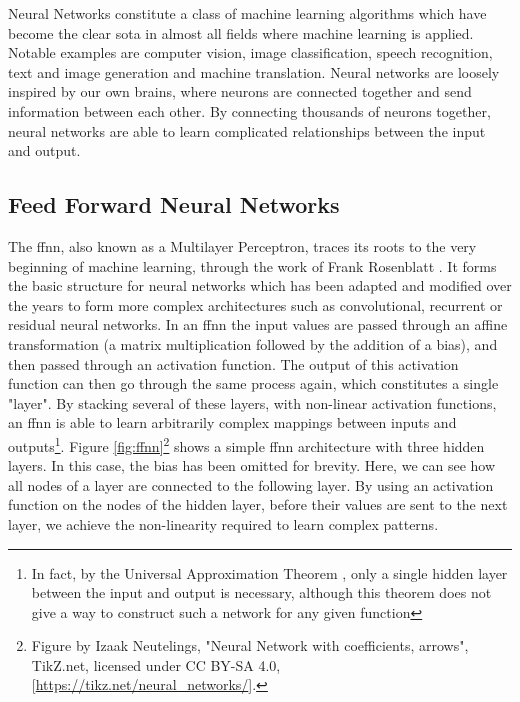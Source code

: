 \documentclass[UKenglish]{uiomasterthesis} %
\theoremstyle{definition}
\begin{document}
Neural Networks constitute a class of machine learning algorithms which have become the clear \ac{sota} in almost all fields where machine learning is applied. Notable examples are computer vision, image classification, speech recognition, text and image generation and machine translation. Neural networks are loosely inspired by our own brains, where neurons are connected together and send information between each other. By connecting thousands of neurons together, neural networks are able to learn complicated relationships between the input and output.

\subsection{Feed Forward Neural Networks}

The \ac{ffnn}, also known as a Multilayer Perceptron, traces its roots to the very beginning of machine learning, through the work of Frank Rosenblatt \cite{rosenblatt}. It forms the basic structure for neural networks which has been adapted and modified over the years to form more complex architectures such as convolutional, recurrent or residual neural networks. In an \ac{ffnn} the input values are passed through an affine transformation (a matrix multiplication followed by the addition of a bias), and then passed through an activation function. The output of this activation function can then go through the same process again, which constitutes a single "layer". By stacking several of these layers, with non-linear activation functions, an \ac{ffnn} is able to learn arbitrarily complex mappings between inputs and outputs\footnote{In fact, by the Universal Approximation Theorem \cite{uat}, only a single hidden layer between the input and output is necessary, although this theorem does not give a way to construct such a network for any given function}. Figure \ref{fig:ffnn}\footnote{Figure by Izaak Neutelings, "Neural Network with coefficients, arrows", TikZ.net, licensed under CC BY-SA 4.0, [\url{https://tikz.net/neural\_networks/}].} shows a simple \ac{ffnn} architecture with three hidden layers. In this case, the bias has been omitted for brevity. Here, we can see how all nodes of a layer are connected to the following layer. By using an activation function on the nodes of the hidden layer, before their values are sent to the next layer, we achieve the non-linearity required to learn complex patterns.
\end{document}
